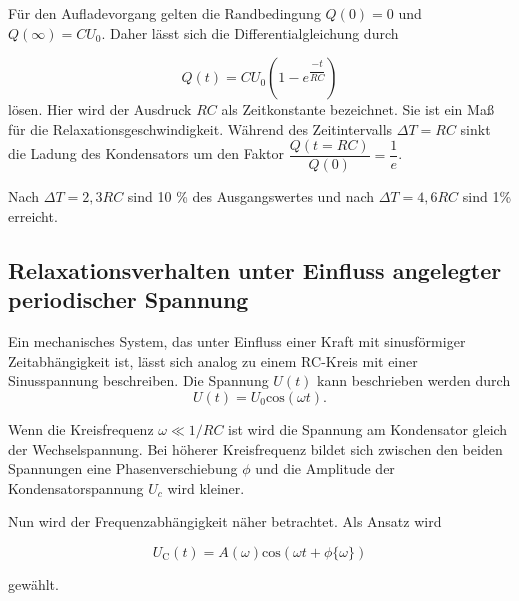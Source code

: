 \noindent Für den Aufladevorgang gelten die Randbedingung  $Q(0)=0$ und $Q(\infty)=CU_0$. 
Daher lässt sich die Differentialgleichung durch 

\begin{equation}
    Q(t) = CU_0(1-e^{\dfrac{-t}{RC}})
\end{equation}
\noindent lösen.
\noindent Hier wird der Ausdruck $RC$ als Zeitkonstante bezeichnet. Sie ist ein Maß für die Relaxationsgeschwindigkeit.
Während des Zeitintervalls $\Delta T=RC$ sinkt die Ladung des Kondensators um den Faktor
 $\dfrac{Q(t=RC)}{Q(0)}=\dfrac{1}{e}$.

\noindent Nach $\Delta T = 2,3RC$ sind 10 \% des Ausgangswertes und nach $\Delta T = 4,6RC$ sind 1\% erreicht.

\subsection{Relaxationsverhalten unter Einfluss angelegter periodischer Spannung}
Ein mechanisches System, das unter Einfluss einer Kraft mit sinusförmiger Zeitabhängigkeit ist, lässt sich analog zu einem RC-Kreis mit 
einer Sinusspannung beschreiben.
Die Spannung $U(t)$ kann beschrieben werden durch 
\begin{equation*}
    U(t) = U_0 \text{cos}( \omega t) .
\end{equation*}

\noindent Wenn die Kreisfrequenz $\omega \ll 1/RC$  ist wird die Spannung am Kondensator gleich der Wechselspannung.
Bei höherer Kreisfrequenz bildet sich zwischen den beiden Spannungen eine Phasenverschiebung $\phi$ und die Amplitude 
der Kondensatorspannung $U_c$ wird kleiner.

Nun wird der Frequenzabhängigkeit näher betrachtet.
Als Ansatz wird

\begin{equation}
    U_{\text{C}}(t) = A(\omega) \text{cos}(\omega t + \phi \{ \omega \} )
    \label{eqn:7}
\end{equation}

\noindent gewählt.


